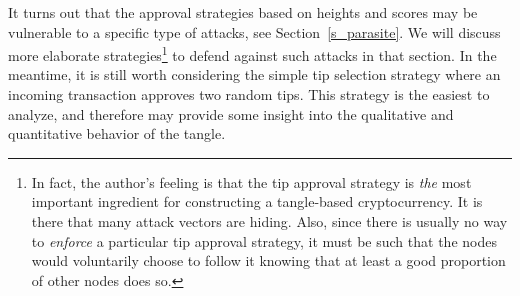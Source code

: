 \documentclass[12pt]{article}
\begin{document}
% 
% 

It turns out that the approval strategies based
on heights and scores may be vulnerable to a specific
type of attacks, see Section~\ref{s_parasite}. We will
discuss more elaborate strategies\footnote{In fact, 
the author's feeling is that the tip approval 
strategy is \emph{the} most important ingredient for 
constructing a tangle-based cryptocurrency. It is there that many
attack vectors are hiding. Also, since there is usually no way to 
\emph{enforce} a particular tip approval strategy, it must 
be such that the nodes would voluntarily choose to follow it
knowing that at least a good proportion of other nodes does so.} 
to defend against such attacks
in that section. 
In the meantime, it is still worth considering
the simple tip selection strategy where an incoming 
transaction approves two random tips. 
This strategy 
is the easiest to analyze, and therefore may 
provide some 
insight into the qualitative and quantitative behavior of the 
tangle.
\end{document}
